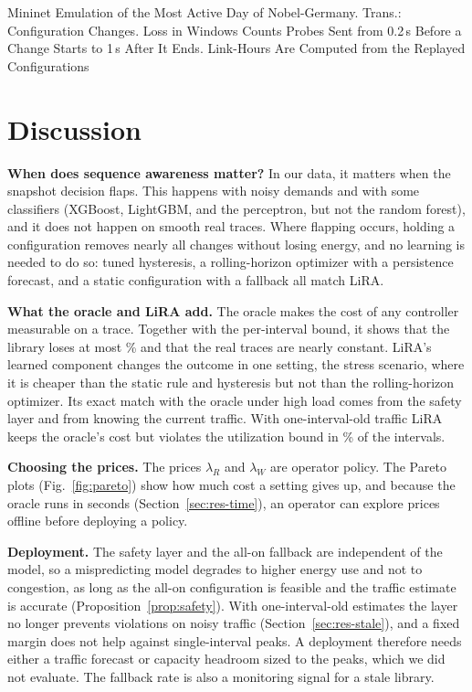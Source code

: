 \documentclass[preprint,12pt]{elsarticle}
\begin{document}
\begin{table}[t]
\centering
\caption{Mininet Emulation of the Most Active Day of Nobel-Germany. Trans.: Configuration Changes. Loss in Windows Counts Probes Sent from 0.2\,s Before a Change Starts to 1\,s After It Ends. Link-Hours Are Computed from the Replayed Configurations}
\label{tab:emu}
\footnotesize
\setlength{\tabcolsep}{4pt}
\begin{adjustbox}{max width=\textwidth}\end{adjustbox}
\end{table}

\section{Discussion}\label{sec:discussion}

\textbf{When does sequence awareness matter?} In our data, it matters when the snapshot decision flaps. This happens with noisy demands and with some classifiers (XGBoost, LightGBM, and the perceptron, but not the random forest), and it does not happen on smooth real traces. Where flapping occurs, holding a configuration removes nearly all changes without losing energy, and no learning is needed to do so: tuned hysteresis, a rolling-horizon optimizer with a persistence forecast, and a static configuration with a fallback all match LiRA.

\textbf{What the oracle and LiRA add.} The oracle makes the cost of any controller measurable on a trace. Together with the per-interval bound, it shows that the library loses at most \boundMaxLoss\% and that the real traces are nearly constant. LiRA's learned component changes the outcome in one setting, the stress scenario, where it is cheaper than the static rule and hysteresis but not than the rolling-horizon optimizer. Its exact match with the oracle under high load comes from the safety layer and from knowing the current traffic. With one-interval-old traffic LiRA keeps the oracle's cost but violates the utilization bound in \staleLiRAViolhl\% of the intervals.

\textbf{Choosing the prices.} The prices $\lambda_R$ and $\lambda_W$ are operator policy. The Pareto plots (Fig.~\ref{fig:pareto}) show how much cost a setting gives up, and because the oracle runs in seconds (Section~\ref{sec:res-time}), an operator can explore prices offline before deploying a policy.

\textbf{Deployment.} The safety layer and the all-on fallback are independent of the model, so a mispredicting model degrades to higher energy use and not to congestion, as long as the all-on configuration is feasible and the traffic estimate is accurate (Proposition~\ref{prop:safety}). With one-interval-old estimates the layer no longer prevents violations on noisy traffic (Section~\ref{sec:res-stale}), and a fixed margin does not help against single-interval peaks. A deployment therefore needs either a traffic forecast or capacity headroom sized to the peaks, which we did not evaluate. The fallback rate is also a monitoring signal for a stale library.
\end{document}

